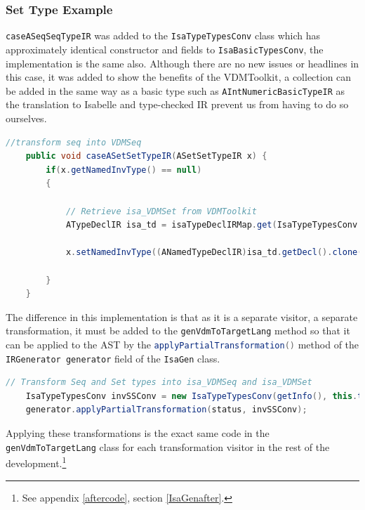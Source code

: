     \subsubsection{Set Type Example}
    \lstinline[language=Java]{caseASeqSeqTypeIR} was added to the \lstinline[language=Java]{IsaTypeTypesConv} class which has approximately identical constructor and fields to \lstinline[language=Java]{IsaBasicTypesConv}, the implementation is the same also. Although there are no new issues or headlines in this case, it was added to show the benefits of the VDMToolkit, a collection can be added in the same way as a basic type such as \lstinline[language=Java]{AIntNumericBasicTypeIR} as the translation to Isabelle and type-checked IR prevent us from having to do so ourselves.
    \begin{lstlisting}[language=Java]
    //transform seq into VDMSeq
    public void caseASetSetTypeIR(ASetSetTypeIR x) {
    	if(x.getNamedInvType() == null)
        {
            
            // Retrieve isa_VDMSet from VDMToolkit
            ATypeDeclIR isa_td = isaTypeDeclIRMap.get(IsaTypeTypesConv.isa_VDMSet);

            x.setNamedInvType((ANamedTypeDeclIR)isa_td.getDecl().clone());
            
        }
    }
    \end{lstlisting} 
	The difference in this implementation is that as it is a separate visitor, a separate transformation, it must be added to the \lstinline[language=Java]{genVdmToTargetLang} method so that it can be applied to the AST by the \lstinline[language=Java]{applyPartialTransformation()} method of the \lstinline[language=Java]{IRGenerator generator} field of the \lstinline[language=Java]{IsaGen} class.
	\begin{lstlisting}[language=Java]
	// Transform Seq and Set types into isa_VDMSeq and isa_VDMSet
    IsaTypeTypesConv invSSConv = new IsaTypeTypesConv(getInfo(), this.transAssistant, vdmToolkitModuleIR);
    generator.applyPartialTransformation(status, invSSConv);
	\end{lstlisting}
	Applying these transformations is the exact same code in the \lstinline[language=Java]{genVdmToTargetLang} class for each transformation visitor in the rest of the development.\footnote{See appendix \ref{aftercode}, section \ref{IsaGenafter}.}

